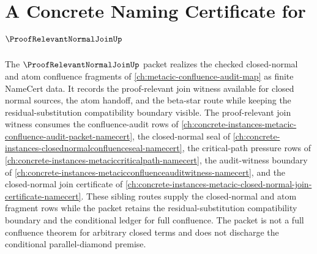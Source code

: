 \chapter{A Concrete Naming Certificate for $\ProofRelevantNormalJoinUp$}
\label{ch:concrete-instances-proof-relevant-normal-join-namecert}

The $\ProofRelevantNormalJoinUp$ packet realizes the checked closed-normal and atom confluence fragments of \autoref{ch:metacic-confluence-audit-map} as finite NameCert data. It records the proof-relevant join witness available for closed normal sources, the atom handoff, and the beta-star route while keeping the residual-substitution compatibility boundary visible. The proof-relevant join witness consumes the confluence-audit rows of \autoref{ch:concrete-instances-metacic-confluence-audit-packet-namecert}, the closed-normal seal of \autoref{ch:concrete-instances-closednormalconfluenceseal-namecert}, the critical-path pressure rows of \autoref{ch:concrete-instances-metaciccriticalpath-namecert}, the audit-witness boundary of \autoref{ch:concrete-instances-metacicconfluenceauditwitness-namecert}, and the closed-normal join certificate of \autoref{ch:concrete-instances-metacic-closed-normal-join-certificate-namecert}. These sibling routes supply the closed-normal and atom fragment rows while the packet retains the residual-substitution compatibility boundary and the conditional ledger for full confluence. The packet is not a full confluence theorem for arbitrary closed terms and does not discharge the conditional parallel-diamond premise.

